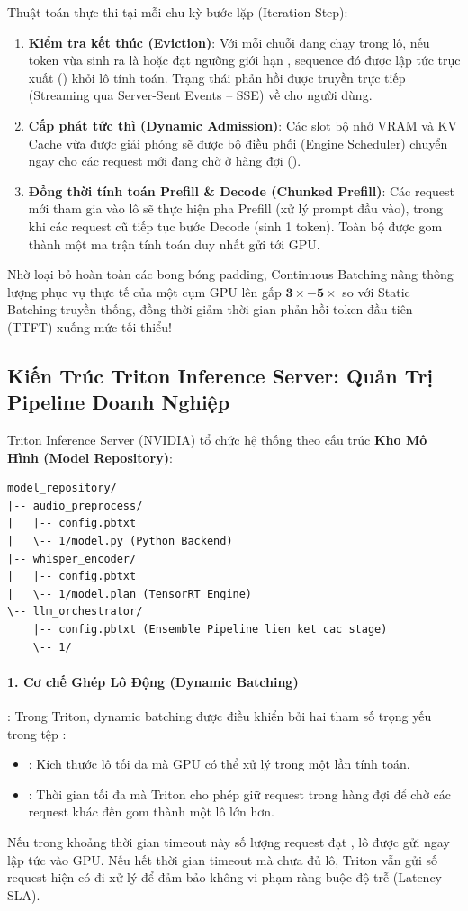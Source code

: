 Thuật toán thực thi tại mỗi chu kỳ bước lặp (Iteration Step):
\begin{enumerate}
  \item \textbf{Kiểm tra kết thúc (Eviction)}: Với mỗi chuỗi đang chạy trong lô, nếu token vừa sinh ra là  hoặc đạt ngưỡng giới hạn , sequence đó được lập tức trục xuất () khỏi lô tính toán. Trạng thái phản hồi được truyền trực tiếp (Streaming qua Server-Sent Events -- SSE) về cho người dùng.
  \item \textbf{Cấp phát tức thì (Dynamic Admission)}: Các slot bộ nhớ VRAM và KV Cache vừa được giải phóng sẽ được bộ điều phối (Engine Scheduler) chuyển ngay cho các request mới đang chờ ở hàng đợi ().
  \item \textbf{Đồng thời tính toán Prefill \& Decode (Chunked Prefill)}: Các request mới tham gia vào lô sẽ thực hiện pha Prefill (xử lý prompt đầu vào), trong khi các request cũ tiếp tục bước Decode (sinh 1 token). Toàn bộ được gom thành một ma trận tính toán duy nhất gửi tới GPU.
\end{enumerate}
Nhờ loại bỏ hoàn toàn các bong bóng padding, Continuous Batching nâng thông lượng phục vụ thực tế của một cụm GPU lên gấp $\mathbf{3\times - 5\times}$ so với Static Batching truyền thống, đồng thời giảm thời gian phản hồi token đầu tiên (TTFT) xuống mức tối thiểu!

\subsection{Kiến Trúc Triton Inference Server: Quản Trị Pipeline Doanh Nghiệp}
Triton Inference Server (NVIDIA) tổ chức hệ thống theo cấu trúc \textbf{Kho Mô Hình (Model Repository)}:
\begin{verbatim}
model_repository/
|-- audio_preprocess/
|   |-- config.pbtxt
|   \-- 1/model.py (Python Backend)
|-- whisper_encoder/
|   |-- config.pbtxt
|   \-- 1/model.plan (TensorRT Engine)
\-- llm_orchestrator/
    |-- config.pbtxt (Ensemble Pipeline lien ket cac stage)
    \-- 1/
\end{verbatim}

\paragraph{1. Cơ chế Ghép Lô Động (Dynamic Batching)}:
Trong Triton, dynamic batching được điều khiển bởi hai tham số trọng yếu trong tệp :
\begin{itemize}
  \item {}: Kích thước lô tối đa mà GPU có thể xử lý trong một lần tính toán.
  \item {}: Thời gian tối đa mà Triton cho phép giữ request trong hàng đợi để chờ các request khác đến gom thành một lô lớn hơn.
\end{itemize}
Nếu trong khoảng thời gian timeout này số lượng request đạt , lô được gửi ngay lập tức vào GPU. Nếu hết thời gian timeout mà chưa đủ lô, Triton vẫn gửi số request hiện có đi xử lý để đảm bảo không vi phạm ràng buộc độ trễ (Latency SLA).

